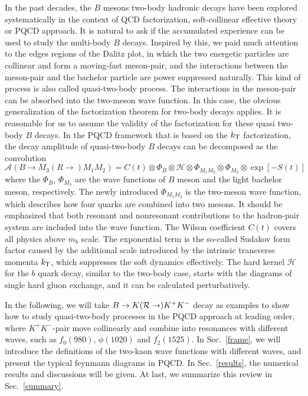 \documentclass[11pt]{article}
\begin{document}
In the past decades, the $B$ mesons two-body hadronic decays have been explored systematically in the context of QCD factorization, soft-collinear effective theory or PQCD approach. It is natural to ask if the accumulated experience can be used to study the multi-body $B$ decays. Inspired by this, we paid much attention to the edges regions of the Dalitz plot, in which the two energetic particles are collinear and form a moving-fast meson-pair, and the interactions between the meson-pair and the bachelor particle are power suppressed naturally. This kind of process is also called quasi-two-body process. The interactions in the meson-pair can be absorbed into the two-meson wave function. In this case, the obvious generalization of the factorization theorem for two-body decays applies. It is reasonable for us to assume the validity of the factorization for these quasi two-body $B$ decays. In the PQCD framework that is based on the $k_{\rm T}$ factorization, the decay amplitude of quasi-two-body $B$ decays can be decomposed as the convolution \cite{Li:2003yj}
\begin{equation}\label{convention}
\mathcal{A}(B\to M_3(R\to) M_1M_2)=C(t)\otimes\Phi_B\otimes\mathcal{H}\otimes\Phi_{M_1M_2}\otimes\Phi_{M_3}\otimes \exp[-S(t)]
\end{equation}
where the $\Phi_{B}$, $\Phi_{M_3}$ are the wave functions of $B$ meson and the light bachelor meson, respectively. The newly introduced $\Phi_{M_1M_2}$ is the two-meson wave function, which describes how four quarks are combined into two mesons. It should be emphasized that both resonant and nonresonant contributions to the hadron-pair system are included into the wave function. The Wilson coefficient $C(t)$ covers all physics above $m_b$ scale. The exponential term is the so-called Sudakov form factor caused by the additional scale introduced by the intrinsic transverse momenta $k_{\rm T}$, which suppresses the soft dynamics effectively.  The hard kernel $\mathcal{H}$ for the $b$ quark decay, similar to the two-body case, starts with the diagrams of single hard gluon exchange, and it can be calculated perturbatively.

In the following, we will take $B\to K({\cal R}\to) K^+K^-$ decay as examples to show how to study  quasi-two-body processes in the PQCD approach at leading order, where $K^+K^-$-pair move collinearly and combine into resonances with different waves, such as $f_0(980)$, $\phi(1020)$ and $f_2^\prime(1525)$. In Sec.~\ref{frame}, we will introduce the definitions of the two-kaon wave functions with different waves, and present the typical feynmann diagrams in PQCD. In Sec.~\ref{results}, the numerical results and discussions will be given. At last, we summarize this review in Sec.~\ref{summary}.
\end{document}
